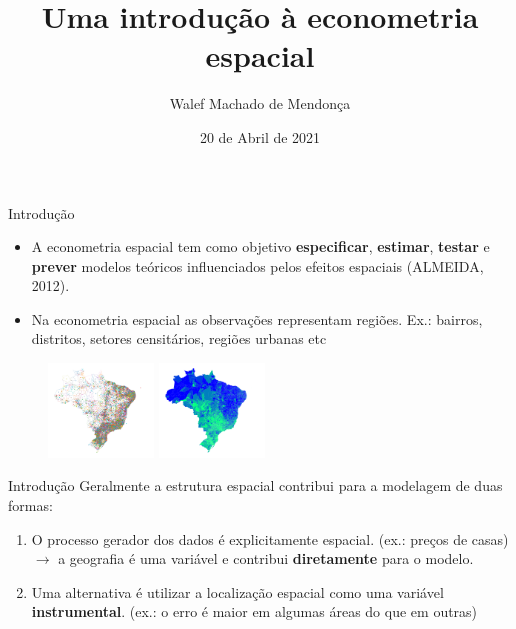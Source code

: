 \documentclass[aspectratio=169]{beamer}
\begin{document}
\title[Universidade Federal de Alfenas -- UNIFAL-MG]{Uma introdução à econometria espacial}

\author{Walef Machado de Mendonça}
\date{20 de Abril de 2021}

\begin{frame}{}
	\titlepage
\end{frame}

\begin{frame}{Introdução}
    
	\begin{itemize}
		\item A econometria espacial tem como objetivo \textbf{especificar}, \textbf{estimar}, \textbf{testar} e \textbf{prever} modelos teóricos influenciados pelos efeitos espaciais (ALMEIDA, 2012).
		\vspace{0.25cm}
		\item Na econometria espacial as observações representam regiões. Ex.: bairros, distritos, setores censitários, regiões urbanas etc
		\vspace{0.25cm}
	\end{itemize}

	\begin{figure}
		\small
		{\includegraphics[width=0.25\textwidth]{img/inf_1.png}}\hspace{0.2cm}
		{\includegraphics[width=0.25\textwidth]{img/inf_2.png}}\hspace{0.2cm}
	\end{figure}
\end{frame}

\begin{frame}{Introdução}
Geralmente a estrutura espacial contribui para a modelagem de duas formas:
\vspace{0.5cm}
		\begin{enumerate}
		    \item O processo gerador dos dados é explicitamente espacial. (ex.: preços de casas) $\rightarrow$ a geografia é uma variável e contribui \textbf{diretamente} para o modelo.
		    \item Uma alternativa é utilizar a localização espacial como uma variável \textbf{instrumental}. (ex.: o erro é maior em algumas áreas do que em outras)
		\end{enumerate}
\end{frame}
\end{document}
